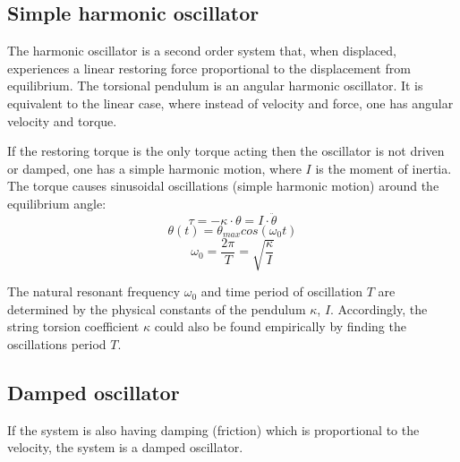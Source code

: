 \documentclass[\main/master.tex]{subfiles}
\begin{document}
\subsection{Simple harmonic oscillator}
The harmonic oscillator is a second order system that, when displaced, experiences a linear restoring force proportional to the displacement from equilibrium. The torsional pendulum is an angular harmonic oscillator. It is equivalent to the linear case, where instead of velocity and force, one has angular velocity and torque.
\par\noindent
If the restoring torque is the only torque acting then the oscillator is not driven or damped, one has a simple harmonic motion, where $I$ is the moment of inertia. The torque causes sinusoidal oscillations (simple harmonic motion) around the equilibrium angle:  
\begin{equation}
 \tau = -\kappa\cdot\theta  = I\cdot\ddot{\theta}   \label{eqn:undamped_motion_equation}
\end{equation}
\begin{equation}
\theta(t) = \theta_{max}cos(\omega_0 t )    \label{eqn:undamped_motion_equation}
\end{equation}
\begin{equation}
\omega_0  = \frac{2\pi}{T} = \sqrt{\frac{\kappa}{I}}   \label{eqn:undamped_motion_equation}
\end{equation}
\par\noindent
The natural resonant frequency $\omega_0$ and time period of oscillation $T$ are determined by the physical constants of the pendulum $\kappa$, $I$. Accordingly, the string torsion coefficient $\kappa$ could also be found empirically by finding the oscillations period $T$.


\subsection{Damped oscillator}
If the system is also having damping (friction) which is proportional to the velocity, the system is a damped oscillator.
\end{document}
